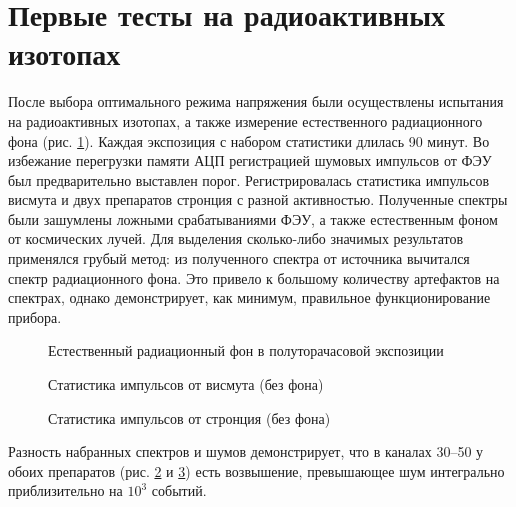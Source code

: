 \documentclass[12pt,a4paper]{report} %
\begin{document}
\section{Первые тесты на радиоактивных изотопах}
После выбора оптимального режима напряжения были осуществлены испытания на радиоактивных изотопах, а также измерение естественного радиационного фона (рис. \ref{figNoise}). Каждая экспозиция с набором статистики длилась 90 минут. Во избежание перегрузки памяти АЦП регистрацией шумовых импульсов от ФЭУ был предварительно выставлен порог. Регистрировалась статистика импульсов висмута и двух препаратов стронция с разной активностью. Полученные спектры были зашумлены ложными срабатываниями ФЭУ, а также естественным фоном от космических лучей. Для выделения сколько-либо значимых результатов применялся грубый метод: из полученного спектра от источника вычитался спектр радиационного фона. Это привело к большому количеству артефактов на спектрах, однако демонстрирует, как минимум, правильное функционирование прибора. 
\begin{figure}
	\noindent{}
	\caption{Естественный радиационный фон в полуторачасовой экспозиции}
	\label{figNoise}
\end{figure}
\begin{figure}
	\noindent{}
	\caption{Статистика импульсов от висмута (без фона)}
	\label{figBi90}
\end{figure}
\begin{figure}
	\noindent{}
	\caption{Статистика импульсов от стронция (без фона)}
	\label{figSTR90}
\end{figure}
Разность набранных спектров и шумов демонстрирует, что в каналах 30--50 у обоих препаратов (рис. \ref{figBi90} и \ref{figSTR90}) есть возвышение, превышающее шум интегрально приблизительно на $10^3$ событий.
\end{document}
